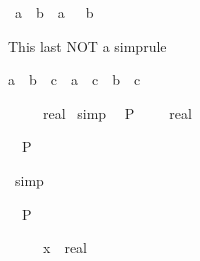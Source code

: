 \begin{isabellebody}
\begin{isamarkuptext}
\begin{isabelle}%
{\isacharminus}\ {\isacharparenleft}a\ {\isacharslash}\ b{\isacharparenright}\ {\isacharequal}\ a\ {\isacharslash}\ {\isacharminus}\ b%
\end{isabelle}

This last NOT a simprule

\begin{isabelle}%
{\isacharparenleft}a\ {\isacharplus}\ b{\isacharparenright}\ {\isacharslash}\ c\ {\isacharequal}\ a\ {\isacharslash}\ c\ {\isacharplus}\ b\ {\isacharslash}\ c%
\end{isabelle}
%
\end{isamarkuptext}%
\isamarkuptrue%
\ {\isachardoublequote}{}{\isacharslash}{}\ {\isacharless}\ {\isacharparenleft}{}{\isacharslash}{}\ {\isacharcolon}{\isacharcolon}\ real{\isacharparenright}{\isachardoublequote}\isanewline
\isamarkupfalse%
\ simp\ \isanewline
\isanewline
\isamarkupfalse%
\ {\isachardoublequote}P\ {\isacharparenleft}{\isacharparenleft}{}{\isacharslash}{}{\isacharparenright}\ {\isacharasterisk}\ {\isacharparenleft}{}{\isacharslash}{}{}\ {\isacharcolon}{\isacharcolon}\ real{\isacharparenright}{\isacharparenright}{\isachardoublequote}\isamarkupfalse%
%
\begin{isamarkuptxt}%
\begin{isabelle}%
\ {}{\isachardot}\ P\ {\isacharparenleft}{}\ {\isacharslash}\ {}\ {\isacharasterisk}\ {\isacharparenleft}{}\ {\isacharslash}\ {}{}{\isacharparenright}{\isacharparenright}%
\end{isabelle}%
\end{isamarkuptxt}%
\isamarkuptrue%
\ simp\isamarkupfalse%
%
\begin{isamarkuptxt}%
\begin{isabelle}%
\ {}{\isachardot}\ P\ {\isacharparenleft}{}\ {\isacharslash}\ {}{\isacharparenright}%
\end{isabelle}%
\end{isamarkuptxt}%
\isamarkuptrue%
\isanewline
\isanewline
\isamarkupfalse%
\ {\isachardoublequote}{\isacharparenleft}{}{\isacharslash}{}{\isacharparenright}\ {\isacharasterisk}\ {\isacharparenleft}{}{\isacharslash}{}{}{\isacharparenright}\ {\isacharless}\ {\isacharparenleft}x\ {\isacharcolon}{\isacharcolon}\ real{\isacharparenright}{\isachardoublequote}\isamarkupfalse%

\end{isabellebody}
